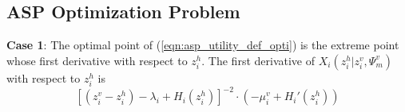 \documentclass[conference]{IEEEtran}
\begin{document}
\subsection{ASP Optimization Problem}
\textbf{Case 1}: The optimal point of (\ref{eqn:asp_utility_def_opti}) is the extreme point whose first derivative with respect to $z_i^h$. The first derivative of $X_i(z_i^h|z_i^v,\Psi_m^v)$ with respect to $z_i^h$ is
\begin{equation} \label{eqn:asp_utilitu_def_firstderiv}
[(z_i^v - z_i^h) - \lambda_i + H_i(z_i^h)]^{-2} \cdot (-\mu_i^v + H_i'(z_i^h))
\end{equation}
\end{document}
